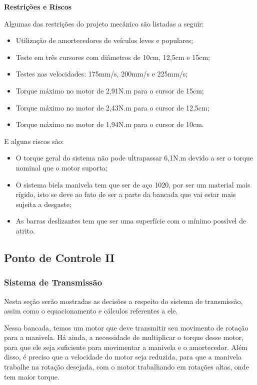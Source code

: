 	\textbf{Restrições e Riscos}

		Algumas das restrições do projeto mecânico são listadas a seguir:

		\begin{itemize}
			\item Utilização de amortecedores de veículos leves e populares;
			\item Teste em três cursores com diâmetros de 10cm, 12,5cm e 15cm;
			\item Testes nas velocidades: 175mm/s, 200mm/s e 225mm/s;
			\item Torque máximo no motor de 2,91N.m para o cursor de 15cm;
			\item Torque máximo no motor de 2,43N.m para o cursor de 12,5cm;
			\item Torque máximo no motor de 1,94N.m para o cursor de 10cm.
		\end{itemize}

		E alguns riscos são:

		\begin{itemize}
			\item O torque geral do sistema não pode ultrapassar 6,1N.m devido a ser o torque nominal que o motor suporta;
			\item O sistema biela manivela tem que ser de aço 1020, por ser um material mais rígido, isto se deve ao fato de ser a parte da bancada que vai estar mais sujeita a desgaste;
			\item As barras deslizantes tem que ser uma superfície com o mínimo possível de atrito. 
		\end{itemize}


\subsection{Ponto de Controle II}
\subsubsection{Sistema de Transmissão}

	Nesta seção serão mostradas as decisões a respeito do sistema de transmissão, assim como o equacionamento e cálculos referentes a ele.


		Nessa bancada, temos um motor que deve transmitir seu movimento de rotação para a manivela. Há ainda, a necessidade de multiplicar o torque desse motor, para que ele seja suficiente para movimentar a manivela e o amortecedor. Além disso, é preciso que a velocidade do motor seja reduzida, para que a manivela trabalhe na rotação desejada, com o motor trabalhando em rotações altas, onde tem maior torque.

